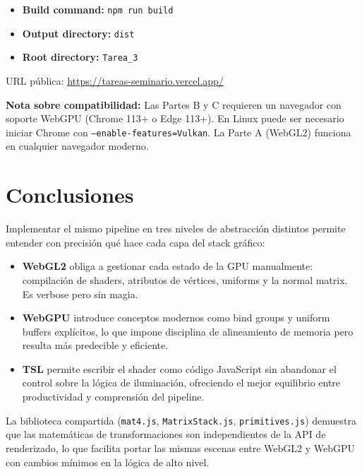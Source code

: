 \documentclass[12pt,a4paper]{article}
\begin{document}
\begin{itemize}[leftmargin=*]
  \item \textbf{Build command:} \texttt{npm run build}
  \item \textbf{Output directory:} \texttt{dist}
  \item \textbf{Root directory:} \texttt{Tarea\_3}
\end{itemize}

URL pública: \url{https://tareas-seminario.vercel.app/}

\textbf{Nota sobre compatibilidad:} Las Partes B y C requieren un navegador con soporte WebGPU (Chrome 113+ o Edge 113+). En Linux puede ser necesario iniciar Chrome con \texttt{--enable-features=Vulkan}. La Parte A (WebGL2) funciona en cualquier navegador moderno.

\section{Conclusiones}

Implementar el mismo pipeline en tres niveles de abstracción distintos permite entender con precisión qué hace cada capa del stack gráfico:

\begin{itemize}[leftmargin=*]
  \item \textbf{WebGL2} obliga a gestionar cada estado de la GPU manualmente: compilación de shaders, atributos de vértices, uniforms y la normal matrix. Es verbose pero sin magia.
  \item \textbf{WebGPU} introduce conceptos modernos como bind groups y uniform buffers explícitos, lo que impone disciplina de alineamiento de memoria pero resulta más predecible y eficiente.
  \item \textbf{TSL} permite escribir el shader como código JavaScript sin abandonar el control sobre la lógica de iluminación, ofreciendo el mejor equilibrio entre productividad y comprensión del pipeline.
\end{itemize}

La biblioteca compartida (\texttt{mat4.js}, \texttt{MatrixStack.js}, \texttt{primitives.js}) demuestra que las matemáticas de transformaciones son independientes de la API de renderizado, lo que facilita portar las mismas escenas entre WebGL2 y WebGPU con cambios mínimos en la lógica de alto nivel.
\end{document}
